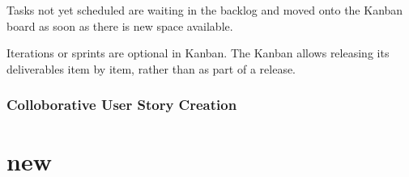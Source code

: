 \documentclass[12pt,a4paper,violet]{bbe}
\begin{document}
    Tasks not yet scheduled are waiting in the backlog and moved onto the Kanban board as soon as there is new space available.
    
	Iterations or sprints are optional in Kanban. The Kanban allows releasing its deliverables item by item, rather than as part of a release.
	
	\subsection{Colloborative User Story Creation}
\chapter{new}
\end{document}
